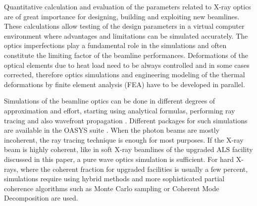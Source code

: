 \documentclass{iucr}              %
\begin{document}
Quantitative calculation and evaluation of the parameters related to X-ray optics are of great importance for designing, building and exploiting new beamlines. These calculations allow testing of the design parameters in a virtual computer environment where advantages and limitations can be simulated accurately. The optics imperfections play a fundamental role in the simulations and often constitute the limiting factor of the beamline performances. Deformations of the optical elements due to heat load need to be always controlled and in some cases corrected, therefore optics simulations and engineering modeling of the thermal deformations by finite element analysis (FEA) have to be developed in parallel. 

Simulations of the beamline optics can be done in different degrees of approximation and effort, starting using analytical formulas, performing ray tracing and also wavefront propagation \cite{hyerarchical}. Different packages for such simulations are available in the OASYS suite \cite{codeOASYS}. When the photon beams are mostly incoherent, the ray tracing technique is enough for most purposes. If the X-ray beam is highly coherent, like in soft X-ray beamlines of the upgraded ALS facility discussed in this paper, a pure wave optics simulation is sufficient. For 
hard X-rays, where the coherent fraction for upgraded facilities is usually a few percent, simulations require using hybrid methods \cite{hybrid} and more sophisticated partial coherence algorithms such as Monte Carlo sampling \cite{Chubar2011b} or Coherent Mode Decomposition \cite{codeCOMSYL} are used. 
\end{document}
